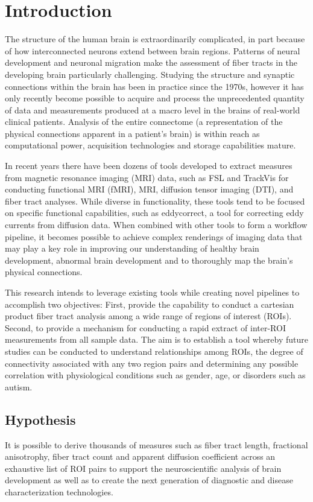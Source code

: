 \chapter{Introduction}
\label{chap:intro}

The structure of the human brain is extraordinarily complicated, in part because 
of how interconnected neurons extend between brain regions. Patterns of neural 
development and neuronal migration make the assessment of fiber tracts in the 
developing brain particularly challenging. Studying the structure and synaptic 
connections within the brain has been in practice since the 1970s, however it 
has only recently become possible to acquire and process the unprecedented 
quantity of data and measurements produced at a macro level in the brains of 
real-world clinical patients.  Analysis of the entire connectome (a 
representation of the physical connections apparent in a patient’s brain) is 
within reach as computational power, acquisition technologies and storage 
capabilities mature.


In recent years there have been dozens of tools developed to extract measures 
from magnetic resonance imaging (MRI) data, such as FSL and TrackVis for 
conducting functional MRI (fMRI), MRI, diffusion tensor imaging (DTI), and fiber 
tract analyses.  While diverse in functionality, these tools tend to be focused 
on specific functional capabilities, such as eddy\textunderscore correct, a tool 
for correcting eddy currents from diffusion data.  When combined with other 
tools to form a workflow pipeline, it becomes possible to achieve complex 
renderings of imaging data that may play a key role in improving our 
understanding of healthy brain development, abnormal brain development and to 
thoroughly map the brain’s physical connections.

This research intends to leverage existing tools while creating novel pipelines 
to accomplish two objectives:  First, provide the capability to conduct a 
cartesian product fiber tract analysis among a wide range of regions of interest 
(ROIs). Second, to provide a mechanism for conducting a rapid extract of 
inter-ROI measurements from all sample data.  The aim is to establish a tool 
whereby future studies can be conducted to understand relationships among ROIs, 
the degree of connectivity associated with any two region pairs and determining 
any possible correlation with physiological conditions such as gender, age, or 
disorders such as autism. 

\section{Hypothesis}
\label{sec:hypothesis}
It is possible to derive thousands of measures such as fiber tract length, 
fractional anisotrophy, fiber tract count and apparent diffusion coefficient 
across an exhaustive list of ROI pairs to support the neuroscientific analysis 
of brain development as well as to create the next generation of diagnostic and 
disease characterization technologies.

